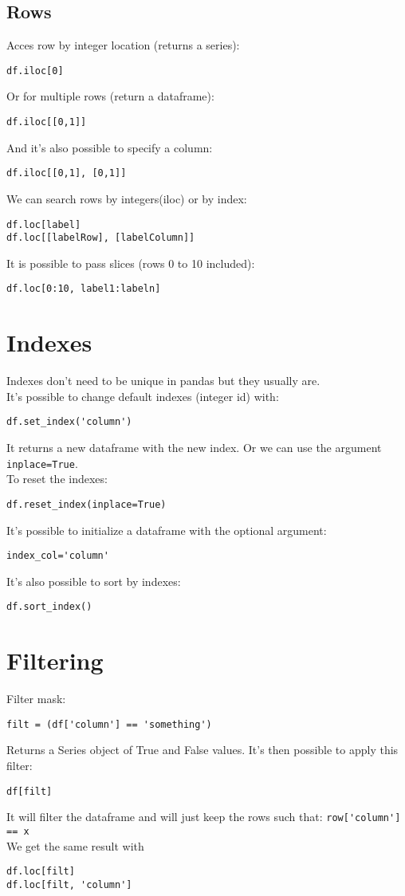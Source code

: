 \documentclass[french]{article}
\begin{document}
\subsection{Rows}
Acces row by integer location (returns a series):
\begin{verbatim}
df.iloc[0]
\end{verbatim}
Or for multiple rows (return a dataframe):
\begin{verbatim}
df.iloc[[0,1]]
\end{verbatim}
And it's also possible to specify a column:
\begin{verbatim}
df.iloc[[0,1], [0,1]]
\end{verbatim}
We can search rows by integers(iloc) or by index:
\begin{verbatim}
df.loc[label]
df.loc[[labelRow], [labelColumn]]
\end{verbatim}
It is possible to pass slices (rows 0 to 10 included):
\begin{verbatim}
df.loc[0:10, label1:labeln]
\end{verbatim}

\section{Indexes}

Indexes don't need to be unique in pandas but they usually are.\\
It's possible to change default indexes (integer id) with:
\begin{verbatim}
df.set_index('column')
\end{verbatim}
It returns a new dataframe with the new index. Or we can use the argument \verb|inplace=True|.\\
To reset the indexes:
\begin{verbatim}
df.reset_index(inplace=True)
\end{verbatim}
It's possible to initialize a dataframe with the optional argument:
\begin{verbatim}
index_col='column'
\end{verbatim}
It's also possible to sort by indexes:
\begin{verbatim}
df.sort_index()
\end{verbatim}

\section{Filtering}

Filter mask:
\begin{verbatim}
filt = (df['column'] == 'something')
\end{verbatim}
Returns a Series object of True and False values. It's then possible to apply this filter:
\begin{verbatim}
df[filt]
\end{verbatim}
It will filter the dataframe and will just keep the rows such that: \verb|row['column'] == x|\\
We get the same result with
\begin{verbatim}
df.loc[filt]
df.loc[filt, 'column']
\end{verbatim}
\end{document}

